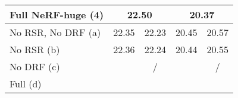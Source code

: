 \begin{table}[h]
{\begin{tabular}{l|*{1}{c}|*{1}{c}|*{1}{c}|*{1}{c}}
        \hline
        Full NeRF-huge (4)      & \multicolumn{2}{c|}{22.50} & \multicolumn{2}{c}{20.37}\\
        \hline
        No RSR, No DRF (a)      & 22.35 & 22.23 & 20.45 & 20.57 \\
        No RSR (b)              & 22.36 & 22.24 & 20.44 & 20.55 \\
        No DRF (c)              & \cellcolor{yellow!50}{22.55} & /     & \cellcolor{yellow!50}{20.46} & / \\
        Full (d)                & \cellcolor{orange!50}{22.57} & \cellcolor{orange!50}{22.71} & \cellcolor{orange!50}{20.47} & \cellcolor{orange!50}{20.64} \\

        \end{tabular}
    }
\end{table}